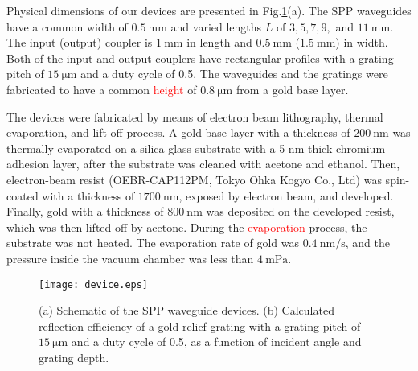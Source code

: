\documentclass[aip,apl,reprint]{revtex4-1}
\begin{document}
Physical dimensions of our devices are presented in Fig.\ref{fig:device}(a).  The SPP waveguides have a common width of $0.5\:\mathrm{mm}$ and varied lengths $L$ of $3, 5, 7, 9,$ and $11\:\mathrm{mm}$. The input (output) coupler is $1\:\mathrm{mm}$ in length and $0.5\:\mathrm{mm}$ ($1.5\:\mathrm{mm}$) in width. Both of the input and output couplers have rectangular profiles with a grating pitch of $15\:\mathrm{\mu m}$ and a duty cycle of 0.5. The waveguides and the gratings were fabricated to have a common \textcolor{red}{height} of $0.8\:\mathrm{\mu m}$ from a gold base layer.

The devices were fabricated by means of electron beam lithography, thermal evaporation, and lift-off process. A gold base layer with a thickness of $200\:\mathrm{nm}$ was thermally evaporated on a silica glass substrate with a 5-nm-thick chromium adhesion layer, after the substrate was cleaned with acetone and ethanol. Then, electron-beam resist (OEBR-CAP112PM, Tokyo Ohka Kogyo Co., Ltd) was spin-coated with a thickness of $1700\:\mathrm{nm}$, exposed by electron beam, and developed. Finally, gold with a thickness of $800\:\mathrm{nm}$ was deposited on the developed resist, which was then lifted off by acetone. During the \textcolor{red}{evaporation} process, the substrate was not heated. The evaporation rate of gold was $0.4\:\mathrm{nm/s}$, and the pressure inside the vacuum chamber was less than $4\:\mathrm{mPa}$.

 \begin{figure}
    \texttt{[image: device.eps]}
    \caption{(a) Schematic of the SPP waveguide devices. (b) Calculated reflection efficiency of a gold relief grating with a grating pitch of $15\:\mathrm{\mu m}$ and a duty cycle of 0.5, as a function of incident angle and grating depth.}
     \label{fig:device}
\end{figure}
\end{document}
